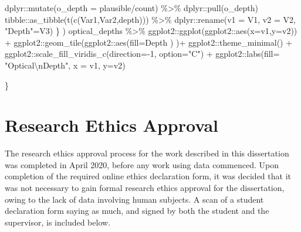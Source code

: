 \documentclass[
  12pt,
  a4paper,
  twoside]{book}
\newenvironment{Shaded}{\begin{snugshade}}{\end{snugshade}}
\newcommand{\AttributeTok}[1]{\textcolor[rgb]{0.77,0.63,0.00}{#1}}
\newcommand{\DecValTok}[1]{\textcolor[rgb]{0.00,0.00,0.81}{#1}}
\newcommand{\FunctionTok}[1]{\textcolor[rgb]{0.00,0.00,0.00}{#1}}
\newcommand{\NormalTok}[1]{#1}
\newcommand{\OtherTok}[1]{\textcolor[rgb]{0.56,0.35,0.01}{#1}}
\newcommand{\SpecialCharTok}[1]{\textcolor[rgb]{0.00,0.00,0.00}{#1}}
\newcommand{\StringTok}[1]{\textcolor[rgb]{0.31,0.60,0.02}{#1}}
\begin{document}
\begin{Shaded}
\begin{Highlighting}[]
\NormalTok{      dplyr}\SpecialCharTok{::}\FunctionTok{mutate}\NormalTok{(}\AttributeTok{o\_depth =}\NormalTok{ plausible}\SpecialCharTok{/}\NormalTok{count) }\SpecialCharTok{\%\textgreater{}\%} 
\NormalTok{      dplyr}\SpecialCharTok{::}\FunctionTok{pull}\NormalTok{(o\_depth)}
\NormalTok{    tibble}\SpecialCharTok{::}\FunctionTok{as\_tibble}\NormalTok{(}\FunctionTok{t}\NormalTok{(}\FunctionTok{c}\NormalTok{(Var1,Var2,depth))) }\SpecialCharTok{\%\textgreater{}\%}
\NormalTok{      dplyr}\SpecialCharTok{::}\FunctionTok{rename}\NormalTok{(}\AttributeTok{v1 =}\NormalTok{ V1, }\AttributeTok{v2 =}\NormalTok{ V2, }\StringTok{"Depth"}\OtherTok{=}\NormalTok{V3)}
\NormalTok{  \} )}
\NormalTok{  optical\_depths }\SpecialCharTok{\%\textgreater{}\%}
\NormalTok{    ggplot2}\SpecialCharTok{::}\FunctionTok{ggplot}\NormalTok{(ggplot2}\SpecialCharTok{::}\FunctionTok{aes}\NormalTok{(}\AttributeTok{x=}\NormalTok{v1,}\AttributeTok{y=}\NormalTok{v2)) }\SpecialCharTok{+}
\NormalTok{    ggplot2}\SpecialCharTok{::}\FunctionTok{geom\_tile}\NormalTok{(ggplot2}\SpecialCharTok{::}\FunctionTok{aes}\NormalTok{(}\AttributeTok{fill=}\NormalTok{Depth  ) )}\SpecialCharTok{+}
\NormalTok{    ggplot2}\SpecialCharTok{::}\FunctionTok{theme\_minimal}\NormalTok{() }\SpecialCharTok{+} 
\NormalTok{    ggplot2}\SpecialCharTok{::}\FunctionTok{scale\_fill\_viridis\_c}\NormalTok{(}\AttributeTok{direction=}\SpecialCharTok{{-}}\DecValTok{1}\NormalTok{,}
                                  \AttributeTok{option=}\StringTok{"C"}\NormalTok{) }\SpecialCharTok{+}
\NormalTok{    ggplot2}\SpecialCharTok{::}\FunctionTok{labs}\NormalTok{(}\AttributeTok{fill=} \StringTok{"Optical}\SpecialCharTok{\textbackslash{}n}\StringTok{Depth"}\NormalTok{,}
                  \AttributeTok{x =}\NormalTok{ v1, }\AttributeTok{y=}\NormalTok{v2)}
  
\NormalTok{\}}
\end{Highlighting}
\end{Shaded}

\hypertarget{research-ethics-approval}{%
\chapter{Research Ethics Approval}\label{research-ethics-approval}}

The research ethics approval process for the work described in this dissertation was completed in April 2020, before any work using data commenced. Upon completion of the required online ethics declaration form, it was decided that it was not necessary to gain formal research ethics approval for the dissertation, owing to the lack of data involving human subjects. A scan of a student declaration form saying as much, and signed by both the student and the supervisor, is included below.
\end{document}
